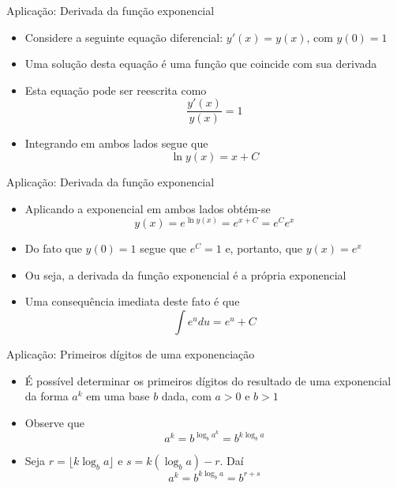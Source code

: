 \begin{frame}[fragile]{Aplicação: Derivada da função exponencial}

    \begin{itemize}
        \item Considere a seguinte equação diferencial: $y'(x) = y(x)$, com $y(0) = 1$

        \item Uma solução desta equação é uma função que coincide com sua derivada

        \item Esta equação pode ser reescrita como
            $$
                \frac{y'(x)}{y(x)} = 1
            $$

        \item Integrando em ambos lados segue que
            $$
                \ln y(x) = x + C
            $$
    \end{itemize}

\end{frame}

\begin{frame}[fragile]{Aplicação: Derivada da função exponencial}

    \begin{itemize}
        \item Aplicando a exponencial em ambos lados obtém-se
            $$
                y(x) = e^{\ln y(x)} = e^{x + C} = e^Ce^x
            $$

        \item Do fato que $y(0) = 1$ segue que $e^C = 1$ e, portanto, que $y(x) = e^x$

        \item Ou seja, a derivada da função exponencial é a própria exponencial

        \item Uma consequência imediata deste fato é que
            $$
            \int e^u du = e^u + C
            $$
    \end{itemize}

\end{frame}

\begin{frame}[fragile]{Aplicação: Primeiros dígitos de uma exponenciação}

    \begin{itemize}
        \item É possível determinar os primeiros dígitos do resultado de uma exponencial da forma $a^k$ em uma base $b$ dada, com $a > 0$ e $b > 1$

        \item Observe que 
            $$
                a^k = b^{\log_b a^k} = b^{k\log_b a}
            $$

        \item Seja $r = \lfloor k\log_b a\rfloor$ e $s = k(\log_b a) - r$. Daí
            $$
            a^k = b^{k\log_b a} = b^{r + s}
            $$
    \end{itemize}

\end{frame}

